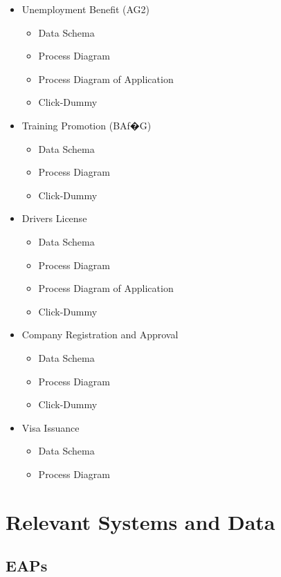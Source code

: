 \documentclass[
     12pt,         %
     a4paper,      %
     BCOR10mm,     %
     DIV14,        %
aragraph skip instad of paragraph indent
     ]{scrreprt}
\begin{document}
\begin{itemize}
     \item Unemployment Benefit (AG2)
\begin{itemize}
     \item Data Schema
     \item Process Diagram
     \item Process Diagram of Application
     \item Click-Dummy
\end{itemize}

\item Training Promotion (BAf�G)
\begin{itemize}
     \item Data Schema
     \item Process Diagram
     \item Click-Dummy
\end{itemize}

\item Drivers License
\begin{itemize}
     \item Data Schema
     \item Process Diagram
     \item Process Diagram of Application
     \item Click-Dummy
\end{itemize}

\item Company Registration and Approval
\begin{itemize}
     \item Data Schema
     \item Process Diagram
     \item Click-Dummy
\end{itemize}

\item Visa Issuance
\begin{itemize}
     \item Data Schema
     \item Process Diagram
\end{itemize}


\end{itemize}


\section{Relevant Systems and Data}

\subsection{EAPs}
\end{document}
